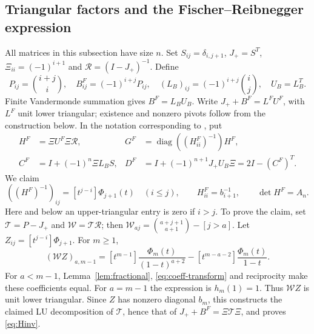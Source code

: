 \documentclass[11pt,a4paper]{amsart}
\theoremstyle{remark}\newtheorem{remark}[theorem]{Remark}
\numberwithin{equation}{section}
\DeclareMathOperator{\diag}{diag}
\begin{document}
\subsection{Triangular factors and the Fischer--Reibnegger expression}
All matrices in this subsection have size $n$. Set $S_{ij}=\delta_{i,j+1}$, $J_+=S^T$, $\Xi_{ii}=(-1)^{i+1}$ and $\mathcal R=(I-J_+)^{-1}$. Define
\[
 P_{ij}=\binom{i+j}{i},\quad B^F_{ij}=(-1)^{i+j}P_{ij},\quad
 (L_B)_{ij}=(-1)^{i+j}\binom ij,\quad U_B=L_B^T.
\]
Finite Vandermonde summation gives $B^F=L_BU_B$. Write $J_++B^F=L^FU^F$, with $L^F$ unit lower triangular; existence and nonzero pivots follow from the construction below. In the notation corresponding to \cite[Remark 5 and Conjecture 6]{FR}, put
\begin{align*}
 H^F&=\Xi U^F\Xi\mathcal R,&G^F&=\diag((H^F_{ii})^{-1})H^F,\\
 C^F&=I+(-1)^n\Xi L_BS,&D^F&=I+(-1)^{n+1}J_+U_B\Xi=2I-(C^F)^T.
\end{align*}
We claim
\begin{equation}\label{eq:Hinv}
 ((H^F)^{-1})_{ij}=[t^{j-i}]\Phi_{j+1}(t)\quad(i\le j),\qquad
 H^F_{ii}=b_{i+1}^{-1},\qquad \det H^F=A_n.
\end{equation}
Here and below an upper-triangular entry is zero if $i>j$.
To prove the claim, set $\mathcal T=P-J_+$ and $\mathcal W=\mathcal T\mathcal R$; then
$\mathcal W_{aj}=\binom{a+j+1}{a+1}-[j>a]$.
Let $Z_{ij}=[t^{j-i}]\Phi_{j+1}$. For $m\ge1$,
\[
 (\mathcal W Z)_{a,m-1}
 =[t^{m-1}]\frac{\Phi_m(t)}{(1-t)^{a+2}}
 -[t^{m-a-2}]\frac{\Phi_m(t)}{1-t}.
\]
For $a<m-1$, Lemma~\ref{lem:fractional}, \eqref{eq:coeff-transform} and reciprocity make these coefficients equal. For $a=m-1$ the expression is $h_m(1)=1$. Thus $\mathcal WZ$ is unit lower triangular. Since $Z$ has nonzero diagonal $b_m$, this constructs the claimed LU decomposition of $\mathcal T$, hence that of $J_++B^F=\Xi\mathcal T\Xi$, and proves \eqref{eq:Hinv}.
\end{document}

